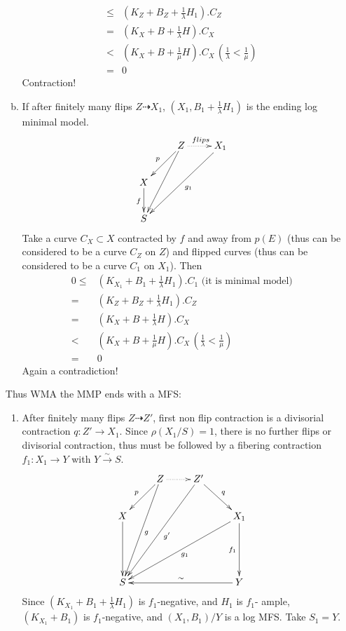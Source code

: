 \documentclass{article}
\begin{document}
\begin{enumerate}[step 1]
\begin{enumerate}[a)]
\begin{equation*}
\begin{aligned}
\leqslant &(K_{Z}+B_{Z}+\frac{1}{\lambda}H_1).C_{Z}\\
=&(K_X+B+\frac{1}{\lambda}H).C_X\\
<&(K_{X}+B+\frac{1}{\mu}H).C_X  \,(\frac{1}{\lambda}<\frac{1}{\mu})\\
=&0
\end{aligned}
\end{equation*} 
Contraction!
\item If after finitely many flips $ Z\dashrightarrow X_1 $,  $ (X_1,B_1+\frac{1}{\lambda}H_1) $ is the ending log minimal model.
$$ \xymatrix{
&Z\ar[ld]_p\ar[ldd]\ar@{.>}[r]^{flips}&X_1\ar[lldd]^{g_1}\\
X\ar[d]_f&&\\
S &&}$$
Take a curve $ C_X\subset X $ contracted by $ f $ and away from $ p(E) $ (thus can be considered to be a curve $ C_Z $ on $ Z $) and flipped curves (thus can be considered to be a curve $ C_{1} $ on $X_1$). Then
\begin{equation*}
\begin{aligned}
0\leqslant& (K_{X_1}+B_1+\frac{1}{\lambda}H_1).C_1 \text{ (it is minimal model)}\\
=&(K_{Z}+B_{Z}+\frac{1}{\lambda}H_1).C_{Z}\\
= &(K_X+B+\frac{1}{\lambda}H).C_X\\
<&(K_{X}+B+\frac{1}{\mu}H).C_X  \,(\frac{1}{\lambda}<\frac{1}{\mu})\\
=&0
\end{aligned}
\end{equation*} 
Again  a contradiction!
\end{enumerate}  
Thus WMA the MMP ends with a MFS:
\begin{enumerate}[1)]
\item After finitely many flips $ Z\dashrightarrow Z' $, first non flip contraction is a divisorial contraction $ q:Z'\to X_1 $. Since $ \rho(X_1/S)=1 $, there is no further flips or divisorial contraction, thus must be followed by a fibering contraction $ f_1:X_1\to Y $ with $ Y\xrightarrow{\sim}S $.
$$ \xymatrix{
&Z\ar[lddd]^g\ar[ld]_p\ar@{.>}[r]&Z'\ar[dr]^{q}\ar[llddd]^{g'}&\\
X\ar[dd]&&&X_1\ar[dd]_{f_1}\ar[ddlll]^{g_1}\\
&&&\\
S&&&Y\ar[lll]_{\sim}} $$
Since $ (K_{X_1}+B_1+\frac{1}{\lambda}H_1) $ is $ f_1 $-negative, and $ H_1 $ is $ f_1 $- ample, $ (K_{X_1}+B_1) $ is $ f_1 $-negative, and $ (X_1,B_1)/Y $ is a log MFS.  Take $ S_1=Y $.


\end{enumerate}
\end{enumerate}
\end{document}
